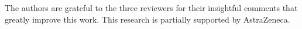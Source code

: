\documentclass[graybox]{svmult}
\begin{document}


\begin{acknowledgement}
The authors are grateful to the three reviewers for their insightful comments that greatly improve this work. This research is partially supported by AstraZeneca.
\end{acknowledgement}

%
%





%
\end{document}
